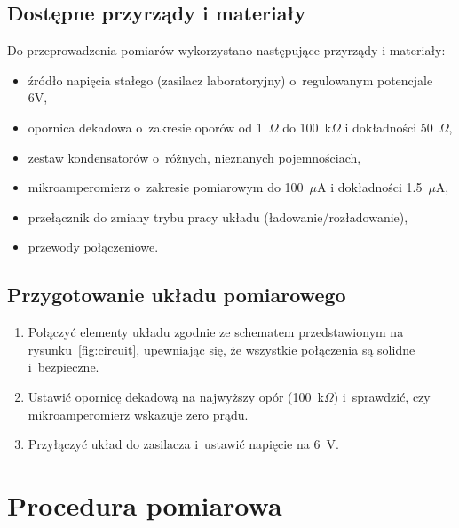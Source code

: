 \documentclass[12pt, a4paper]{article}
\begin{document}
\subsection{Dostępne przyrządy i materiały}
Do przeprowadzenia pomiarów wykorzystano następujące przyrządy i materiały:
\begin{itemize}
    \item źródło napięcia stałego (zasilacz laboratoryjny) o~regulowanym potencjale 6V,
    \item opornica dekadowa o~zakresie oporów od 1~$\Omega$ do 100~k$\Omega$ i dokładności 50~$\Omega$,
    \item zestaw kondensatorów o~różnych, nieznanych pojemnościach,
    \item mikroamperomierz o~zakresie pomiarowym do 100~$\mu$A i dokładności 1.5~$\mu$A,
    \item przełącznik do zmiany trybu pracy układu (ładowanie/rozładowanie),
    \item przewody połączeniowe.
\end{itemize}

\subsection{Przygotowanie układu pomiarowego}

\begin{enumerate}
    \item Połączyć elementy układu zgodnie ze schematem przedstawionym na
          rysunku~\ref{fig:circuit}, upewniając się, że wszystkie połączenia są
          solidne i~bezpieczne.
    \item Ustawić opornicę dekadową na najwyższy opór (100~k$\Omega$) i~sprawdzić,
          czy mikroamperomierz wskazuje zero prądu.
    \item Przyłączyć układ do zasilacza i~ustawić napięcie na 6~V.
\end{enumerate}

\section{Procedura pomiarowa}
\end{document}
